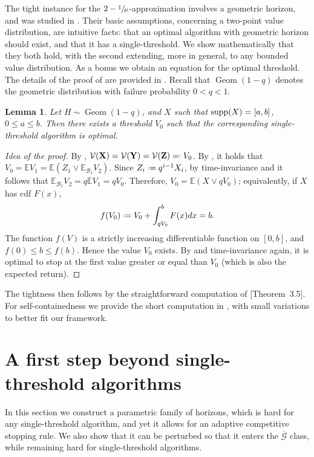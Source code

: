 \documentclass[11pt, a4paper, twoside]{article}
\newcommand*{\defeq}{\mathrel{\vcenter{\baselineskip0.5ex \lineskiplimit0pt
			\hbox{\scriptsize.}\hbox{\scriptsize.}}}=}
\newcommand*{\eqdef}{=\mathrel{\vcenter{\baselineskip0.5ex\lineskiplimit0pt
			\hbox{\scriptsize.}\hbox{\scriptsize.} }}}
\newcommand{\EE}{\mathbb{E}}
\newcommand{\PGFd}{\overline{\mathcal{G}}}
\newcommand{\Val}{\mathcal{V}}
\newcommand{\YY}{\mathbf{Y}}
\newcommand{\XX}{\mathbf{X}}
\newcommand{\DZ}{\mathbf{Z}}
\newcommand{\DF}{\mathcal{B}}
\DeclareMathOperator{\Geom}{Geom}
\newtheorem{lemma}{Lemma}[section]
\numberwithin{equation}{section}
\begin{document}
  	The tight instance for the $2-\sfrac{1}{\mu}$-approximation involves a geometric horizon, and was studied in \cite[Theorem~3.5]{AliBanGolMunWan20}. Their basic assumptions, concerning a two-point value distribution, are intuitive facts: that an optimal algorithm with geometric horizon should exist, and that it has a single-threshold. We show mathematically that they both hold, with the second extending, more in general, to any bounded value distribution. As a bonus we obtain an equation for the optimal threshold. The details of the proof of  are provided in . Recall that $\Geom(1-q)$ denotes the geometric distribution with failure probability $0<q<1$.
	\begin{lemma}\label{geomprice}
		Let $H\sim\Geom(1-q)$, and $X$ such that $\operatorname{supp}(X)=[a,b]$, $0\le a\le b$. Then there exists a threshold $V_0$ such that the corresponding single-threshold algorithm is optimal.
	\end{lemma}
	\begin{proof}[Idea of the proof]
		By , $\Val(\XX)=\Val(\YY)=\Val(\DZ)\eqdef V_0$. By , it holds that $V_0=\EE V_1=\EE (Z_1\vee\EE_{\DF_1}V_{2}).$ Since $Z_i\defeq q^{i-1}X_i$, by time-invariance and  it follows that $\EE_{\DF_1}V_{2}=q\EE V_1=qV_0$. Therefore, $V_0=\EE (X\vee qV_0)$; equivalently, if $X$ has cdf $F(x)$, \[f(V_0)\defeq V_0+\int_{qV_0}^bF(x)dx=b.\] The function $f(V)$ is a strictly increasing differentiable function on $[0,b]$, and $f(0)\le b\le f(b)$. Hence the value $V_0$ exists. By  and time-invariance again, it is optimal to stop at the first value greater or equal than $V_0$ (which is also the expected return).
	\end{proof}
	The tightness then follows by the straightforward computation of \cite{AliBanGolMunWan20}[Theorem~3.5]. For self-containedness we provide the short computation in , with small variations to better fit our framework.
	
	\section{A first step beyond single-threshold algorithms}\label{hardsecretary}
	In this section we construct a parametric family of horizons, which is hard for any single-threshold algorithm, and yet it allows for an adaptive competitive stopping rule. We also show that it can be perturbed so that it enters the $\PGFd$ class, while remaining hard for single-threshold algorithms.
	
\end{document}
